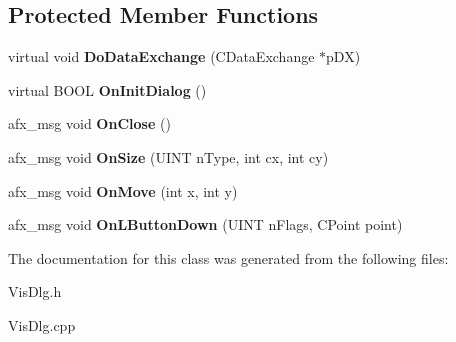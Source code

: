 \subsection*{Protected Member Functions}
\begin{DoxyCompactItemize}
\item 
\hypertarget{class_c_vis_dlg_a39218fc16ee7722682860c7b702e816f}{virtual void {\bfseries Do\-Data\-Exchange} (C\-Data\-Exchange $\ast$p\-D\-X)}\label{class_c_vis_dlg_a39218fc16ee7722682860c7b702e816f}

\item 
\hypertarget{class_c_vis_dlg_a2a664d864a345db5c80b23c1e860c942}{virtual B\-O\-O\-L {\bfseries On\-Init\-Dialog} ()}\label{class_c_vis_dlg_a2a664d864a345db5c80b23c1e860c942}

\item 
\hypertarget{class_c_vis_dlg_a44f5f316a1705016a2443517bcea61eb}{afx\-\_\-msg void {\bfseries On\-Close} ()}\label{class_c_vis_dlg_a44f5f316a1705016a2443517bcea61eb}

\item 
\hypertarget{class_c_vis_dlg_a03cdf9fa049f011208cf5be103fdebca}{afx\-\_\-msg void {\bfseries On\-Size} (U\-I\-N\-T n\-Type, int cx, int cy)}\label{class_c_vis_dlg_a03cdf9fa049f011208cf5be103fdebca}

\item 
\hypertarget{class_c_vis_dlg_a35129a2977a57f2b3dbeca208758bb91}{afx\-\_\-msg void {\bfseries On\-Move} (int x, int y)}\label{class_c_vis_dlg_a35129a2977a57f2b3dbeca208758bb91}

\item 
\hypertarget{class_c_vis_dlg_a9d79c93b6be0d8d7f3cfbf510f69e917}{afx\-\_\-msg void {\bfseries On\-L\-Button\-Down} (U\-I\-N\-T n\-Flags, C\-Point point)}\label{class_c_vis_dlg_a9d79c93b6be0d8d7f3cfbf510f69e917}

\end{DoxyCompactItemize}


The documentation for this class was generated from the following files\-:\begin{DoxyCompactItemize}
\item 
Vis\-Dlg.\-h\item 
Vis\-Dlg.\-cpp\end{DoxyCompactItemize}
